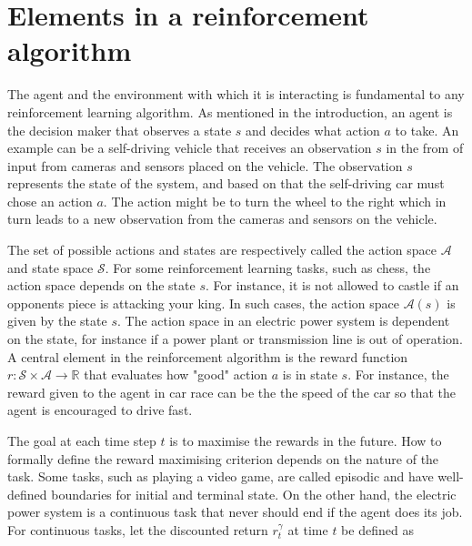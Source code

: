 \documentclass[class=book, crop=false, 11pt]{standalone}
\begin{document}
\section{Elements in a reinforcement algorithm}

The agent and the environment with which it is interacting is fundamental to any reinforcement learning algorithm. As mentioned in the introduction, an agent is the decision maker that observes a state $s$ and decides what action $a$ to take. An example can be a self-driving vehicle that receives an observation $s$ in the from of input from cameras and sensors placed on the vehicle. The observation $s$ represents the state of the system, and based on that the self-driving car must chose an action $a$. The action might be to turn the wheel to the right which in turn leads to a new observation from the cameras and sensors on the vehicle.

The set of possible actions and states are respectively called the action space $\mathcal{A}$ and state space $\mathcal{S}$. For some reinforcement learning tasks, such as chess, the action space depends on the state $s$. For instance, it is not allowed to castle if an opponents piece is attacking your king. In such cases, the action space $\mathcal{A}(s)$ is given by the state $s$. The action space in an electric power system is dependent on the state, for instance if a power plant or transmission line is out of operation. A central element in the reinforcement algorithm is the reward function $r: \mathcal{S} \times \mathcal{A} \to \mathbb{R}$ that evaluates how "good" action $a$ is in state $s$. For instance, the reward given to the agent in car race can be the the speed of the car so that the agent is encouraged to drive fast.

The goal at each time step $t$ is to maximise the rewards in the future. How to formally define the reward maximising criterion depends on the nature of the task. Some tasks, such as playing a video game, are called episodic and have well-defined boundaries for initial and terminal state. On the other hand, the electric power system is a continuous task that never should end if the agent does its job. For continuous tasks, let the discounted return $r^{\gamma}_{t}$ at time $t$ be defined as 
\end{document}
